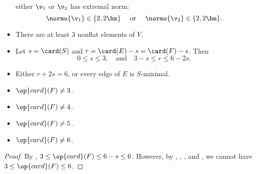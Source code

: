 \begin{lemma}
\begin{itemize}
either $\v_1$ or $\v_2$ has extremal norm:
\begin{displaymath}\normo{\v_1}\in \{2,2\hm\}\quad\text{ or }\quad
\normo{\v_2}\in \{2,2\hm\}.\end{displaymath}
\item {} There are at least $3$ nonflat elements of $V$.
\item {} %
Let      $s=\card(S)$ and $r=\card(E) - s = \card(F)-s$.  Then
\begin{displaymath}0\le s \le 3,\quad\text{and}\quad3-s \le r \le 6 -
2s.\end{displaymath}
\item {} Either $r+2s = 6$, or every edge of $E$ is $S$-minimal.
\item {} $\op{card}(F) \ne 3$.
\item {} $\op{card}(F) \ne 4$.
\item {} $\op{card}(F) \ne 5$.
\item {} $\op{card}(F) \ne 6$.
\end{itemize}
\end{lemma}

\begin{proof}
By ,   $3\le\op{card}(F)\le 6-s\le 6$.  However, by ,
, , and , we cannot have
$3\le\op{card}(F)\le 6$.
\end{proof}



